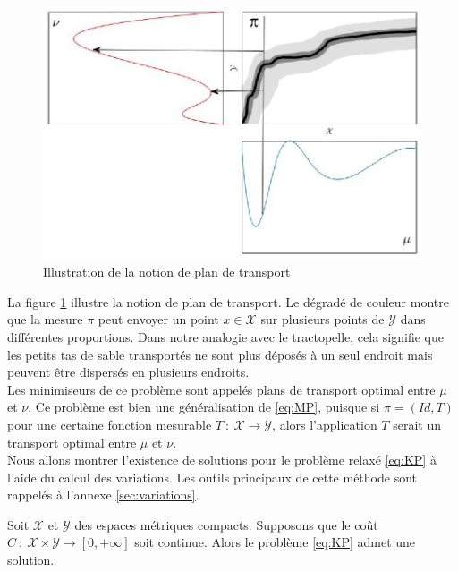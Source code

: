 \documentclass[a4paper,12pt]{article}
\begin{document}
\begin{figure}[!h]
\centering
\includegraphics[width=0.6\linewidth]{img/transport_plan2.jpg}
\caption{Illustration de la notion de plan de transport\label{fig:plantransp}}
\end{figure}
La figure \ref{fig:plantransp} illustre la notion de plan de transport. Le dégradé de couleur montre que la mesure $\pi$ peut envoyer un point $x\in\mathcal{X}$ sur plusieurs points de $\mathcal{Y}$ dans différentes proportions. Dans notre analogie avec le tractopelle, cela signifie que les petits tas de sable transportés ne sont plus déposés à un seul endroit mais peuvent être dispersés en plusieurs endroits.\\
Les minimiseurs de ce problème sont appelés plans de transport optimal entre $\mu$ et $\nu$. Ce problème est bien une généralisation de \eqref{eq:MP}, puisque si $\pi = (Id,T)$ pour une certaine fonction mesurable $T\ :\ \mathcal{X}\rightarrow\mathcal{Y}$, alors l'application $T$ serait un transport optimal entre $\mu$ et $\nu$. \\
Nous allons montrer l'existence de solutions pour le problème relaxé \eqref{eq:KP} à l'aide du calcul des variations. Les outils principaux de cette méthode sont rappelés à l'annexe \ref{sec:variations}. 
\begin{theoreme}{}
Soit $\mathcal{X}$ et $\mathcal{Y}$ des espaces métriques compacts. Supposons que le coût $C\ :\ \mathcal{X}\times\mathcal{Y}\rightarrow [0,+\infty]$ soit continue. Alors le problème \eqref{eq:KP} admet une solution.
\end{theoreme}
\end{document}
